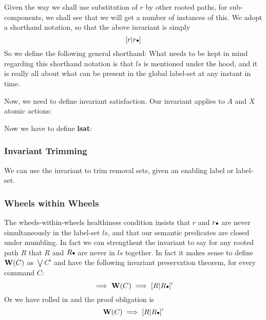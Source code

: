 Given the way we shall use substitution of $r$ by
other rooted paths, for sub-components,
we shall see that we will get a number of instances of this.
We adopt a shorthand notation,
so that the above invariant is simply
\[
  [r|r{\scriptstyle{\bullet}}]
\]
So we define the following general shorthand:
What needs to be kept in mind regarding this shorthand notation
is that $ls$ is mentioned under the hood,
and it is really all about what can be present in the global label-set
at any instant in time.


Now, we need to define invariant satisfaction.
Our invariant applies to $A$ and $X$ atomic actions:

Now we have to define \textbf{lsat}:

\subsubsection{Invariant Trimming}

We can use the invariant to trim removal sets,
given an enabling label or label-set.

\subsubsection{Wheels within Wheels}\label{hc:WwW}

The wheels-within-wheels healthiness condition
insists that $r$ and $r{\scriptstyle{\bullet}}$ are never simultaneously in
the label-set $ls$,
and that our semantic predicates are closed under mumbling.
In fact we can strengthent the invariant to say for any rooted path $R$
that $R$ and $R{\scriptstyle{\bullet}}$ are never in $ls$ together.
In fact it makes sense to define $\mathbf{W}(C)$ as $\bigvee C^i$
and have the following invariant preservation theorem, for every command $C$:
\begin{equation*}
   [R|\RR\bullet] \implies \W(C) \implies [R|\RR\bullet]'
\end{equation*}
Or we have rolled in and the proof obligation is
\begin{equation*}
   \mathbf{W}(C) \implies [R|R{\scriptstyle{\bullet}}]'
\end{equation*}



